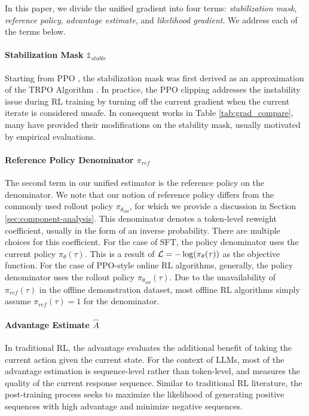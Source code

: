 In this paper, we divide the unified gradient into four terms: \textit{stabilization mask}, \textit{reference policy}, \textit{advantage estimate}, and \textit{likelihood gradient}. We address each of the terms below.




\paragraph{Stabilization Mask $\mathbb{1}_{stable}$} Starting from PPO \citep{schulman2017proximal}, the stabilization mask was first derived as an approximation of the TRPO Algorithm \citep{schulman2015trust}.
In practice, the PPO clipping addresses the instability issue during RL training by turning off the current gradient when the current iterate is considered unsafe. In consequent works in Table \ref{tab:grad_compare}, many have provided their modifications on the stability mask, usually motivated by empirical evaluations.



\paragraph{Reference Policy Denominator $\pi_{ref}$} The second term in our unified estimator is the reference policy on the denominator. We note that our notion of reference policy differs from the commonly used rollout policy $\pi_{\theta_{old}}$, for which we provide a discussion in Section \ref{sec:component-analysis}. This denominator denotes a token-level reweight coefficient, usually in the form of an inverse probability. There are multiple choices for this coefficient. For the case of SFT, the policy denominator uses the current policy $\pi_\theta (\tau )$. This is a result of $\mathcal{L} = -\log (\pi_\theta (\tau ))$ as the objective function. For the case of PPO-style online RL algorithms, generally, the policy denominator uses the rollout policy $\pi_{\theta_{old}} (\tau )$. Due to the unavailability of $\pi_{ref} (\tau )$ in the offline demonstration dataset, most offline RL algorithms simply assume $\pi_{ref} (\tau )= 1$ for the denominator. 


\paragraph{Advantage Estimate $\hat{A}$} 
In traditional RL, the advantage evaluates the additional benefit of taking the current action given the current state. For the context of LLMs, most of the advantage estimation is sequence-level rather than token-level, and measures the quality of the current response sequence. Similar to traditional RL literature, the post-training process seeks to maximize the likelihood of generating positive sequences with high advantage and minimize negative sequences.


